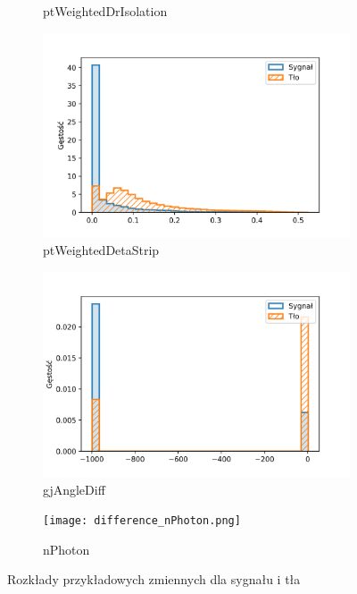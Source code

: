 \documentclass{pracalicmgr}
\begin{document}
\begin{figure}
\begin{subfigure}{.5\textwidth}
	\caption{ptWeightedDrIsolation}
	\end{subfigure}
	\begin{subfigure}{.5\textwidth}
	\centering
	\includegraphics[width=1\textwidth]{difference_ptWeightedDetaStrip.png}
	\caption{ptWeightedDetaStrip}
	\end{subfigure}
	\begin{subfigure}{.5\textwidth}
	\centering
	\includegraphics[width=1\textwidth]{difference_gjAngleDiff.png}
	\caption{gjAngleDiff}
	\end{subfigure}
	\begin{subfigure}{.5\textwidth}
	\centering
	\texttt{[image: difference\_nPhoton.png]}
	\caption{nPhoton}
	\end{subfigure}
	\caption{Rozkłady przykładowych zmiennych dla sygnału i tła}
	\label{fig:diff}
	\end{figure}	
\end{document}
